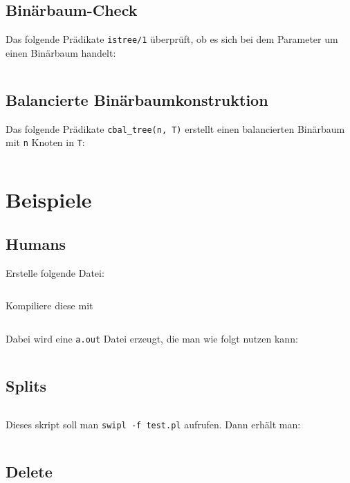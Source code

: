 \subsection{Binärbaum-Check}
Das folgende Prädikate \texttt{istree/1} überprüft, ob es sich bei dem Parameter
um einen Binärbaum handelt:

\inputminted[numbersep=5pt, tabsize=4]{prolog}{scripts/prolog/istree.pl}

\subsection{Balancierte Binärbaumkonstruktion}
Das folgende Prädikate \texttt{cbal\_tree(n, T)} erstellt einen balancierten
Binärbaum mit \texttt{n} Knoten in \texttt{T}:

\inputminted[numbersep=5pt, tabsize=4]{prolog}{scripts/prolog/balancedtreeconstruction.pl}

\section{Beispiele}
\subsection{Humans}
Erstelle folgende Datei:
\inputminted[linenos, numbersep=5pt, tabsize=4, frame=lines, label=human.pro]{prolog}{scripts/prolog/human.pro}

Kompiliere diese mit
\inputminted[numbersep=5pt, tabsize=4]{bash}{scripts/prolog/human.sh}

Dabei wird eine \texttt{a.out} Datei erzeugt, die man wie folgt
nutzen kann:
\inputminted[numbersep=5pt, tabsize=4]{bash}{scripts/prolog/human-2.sh}

\subsection{Splits}
\inputminted[linenos, numbersep=5pt, tabsize=4, frame=lines, label=splits.pl]{prolog}{scripts/prolog/splits.pl}

Dieses skript soll man \texttt{swipl -f test.pl} aufrufen. Dann erhält man:

\inputminted[numbersep=5pt, tabsize=4]{prolog}{scripts/prolog/splits.sh}

\subsection{Delete}%
\inputminted[numbersep=5pt, tabsize=4]{prolog}{scripts/prolog/delete.pl}

